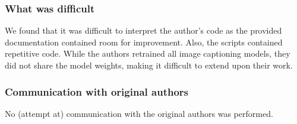 \subsubsection*{What was difficult}
We found that it was difficult to interpret the author's code as the provided documentation contained room for improvement. Also, the scripts contained repetitive code. While the authors retrained all image captioning models, they did not share the model weights, making it difficult to extend upon their work.

\subsubsection*{Communication with original authors}
No (attempt at) communication with the original authors was performed.
